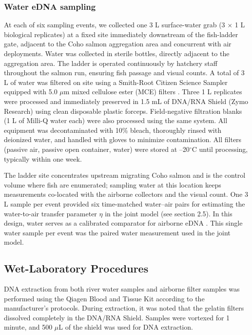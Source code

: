 \documentclass{article}
\begin{document}
\subsubsection{Water eDNA sampling}
At each of six sampling events, we collected one 3 L surface-water grab (3 × 1 L biological replicates) at a fixed site immediately downstream of the fish-ladder gate, adjacent to the Coho salmon aggregation area and concurrent with air deployments. Water was collected in sterile bottles, directly adjacent to the aggregation area. The ladder is operated continuously by hatchery staff throughout the salmon run, ensuring fish passage and visual counts. A total of 3 L of water was filtered on site using a Smith-Root Citizen Science Sampler equipped with 5.0 $\mu$m mixed cellulose ester (MCE) filters \cite{allan2023}. Three 1 L replicates were processed and immediately preserved in 1.5 mL of DNA/RNA Shield (Zymo Research) using clean disposable plastic forceps. Field-negative filtration blanks (1 L of Milli-Q water each) were also processed using the same system. All equipment was decontaminated with 10\% bleach, thoroughly rinsed with deionized water, and handled with gloves to minimize contamination. All filters (passive air, passive open container, water) were stored at –20$^\circ$C until processing, typically within one week.

The ladder site concentrates upstream migrating Coho salmon and is the control volume where fish are enumerated; sampling water at this location keeps measurements co-located with the airborne collectors and the visual count. One 3 L sample per event provided six time-matched water–air pairs for estimating the water-to-air transfer parameter $\eta$ in the joint model (see section 2.5). In this design, water serves as a calibrated comparator for airborne eDNA \cite{guri2024, shelton2022}. This single water sample per event was the paired water measurement used in the joint model.

\subsection{Wet-Laboratory Procedures}
DNA extraction from both river water samples and airborne filter samples was performed using the Qiagen Blood and Tissue Kit according to the manufacturer’s protocols. During extraction, it was noted that the gelatin filters dissolved completely in the DNA/RNA Shield. Samples were vortexed for 1 minute, and 500 $\mu$L of the shield was used for DNA extraction.
\end{document}
